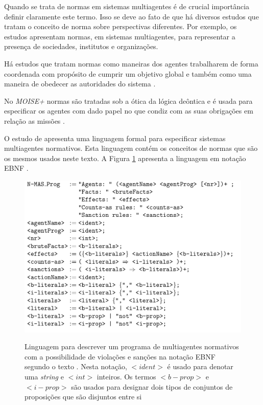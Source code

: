 Quando se trata de normas em sistemas multiagentes é de crucial importância definir claramente este termo. Isso se deve ao fato de que há diversos estudos que tratam o conceito de norma sobre perspectivas diferentes. Por exemplo, os estudos \cite{formalizeagent,formalizeagent2} apresentam normas, em sistemas multiagentes, para representar a presença de sociedades, institutos e organizações. 

Há estudos que tratam normas como maneiras dos agentes trabalharem de forma coordenada com propósito de cumprir um objetivo global e também como uma maneira de obedecer as autoridades do sistema \cite{modelingnormsforautnomousagent,amodelmultiagentsystemdynamicrelationship}. 

No \textit{MOISE+} normas são tratadas sob a ótica da lógica deôntica e é usada para especificar os agentes com dado papel no que condiz com as suas obrigações em relação as missões \cite{moiseframework,moiseframeworktwo}.

O estudo de \cite{dastaniframework} apresenta uma linguagem formal para especificar sistemas multiagentes normativos. Esta linguagem contém os conceitos de normas que são os mesmos usados neste texto. A Figura \ref{descreveprograma} apresenta a linguagem em notação EBNF \cite{dastaniframework}.

\begin{figure}[H]
  \centering
  \caption{Linguagem para descrever um programa de multiagentes normativos com a possibilidade de violações e sanções na notação EBNF segundo o texto \cite{dastaniframework}. Nesta notação, $<ident>$ é usado para denotar uma \textit{string} e $<int>$ inteiros. Os termos $<b-prop>$ e $<i-prop>$ são usados para designar dois tipos de conjuntos de proposições que são disjuntos entre si}
  \includegraphics[width=0.8\linewidth]{figure/masprogram.png}
  \begin{center}
  	\cite{dastaniframework}
  \end{center} 
  \label{descreveprograma}
\end{figure}

